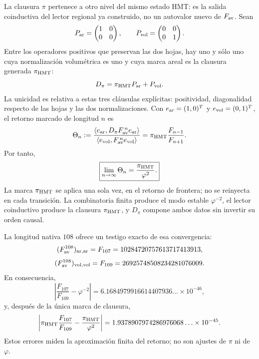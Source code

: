 La clausura \(\pi\) pertenece a otro nivel del mismo estado HMT: es la salida
coinductiva del lector regional ya construido, no un autovalor nuevo de
\(F_{\rm av}\). Sean
\[
 P_{\rm ar}=
 \begin{pmatrix}1&0\\0&0\end{pmatrix},
 \qquad
 P_{\rm vol}=
 \begin{pmatrix}0&0\\0&1\end{pmatrix}.
\]
Entre los operadores positivos que preservan las dos hojas, hay uno y sólo
uno cuya normalización volumétrica es uno y cuya marca areal es la clausura
generada \(\pi_{\rm HMT}\):
\[
 D_\pi=\pi_{\rm HMT}P_{\rm ar}+P_{\rm vol}.
\]
La unicidad es relativa a estas tres cláusulas explícitas: positividad,
diagonalidad respecto de las hojas y las dos normalizaciones. Con
\(e_{\rm ar}=(1,0)^T\) y \(e_{\rm vol}=(0,1)^T\), el retorno marcado de
longitud \(n\) es
\[
 \Theta_n
 :=
 \frac{\langle e_{\rm ar},
 D_\pi F_{\rm av}^{\,n}e_{\rm ar}\rangle}
 {\langle e_{\rm vol},
 F_{\rm av}^{\,n}e_{\rm vol}\rangle}
 =
 \pi_{\rm HMT}\frac{F_{n-1}}{F_{n+1}}.
\]
Por tanto,
\[
 \boxed{\displaystyle
 \lim_{n\to\infty}\Theta_n
 =\frac{\pi_{\rm HMT}}{\varphi^2}.}
\]
La marca \(\pi_{\rm HMT}\) se aplica una sola vez, en el retorno de frontera;
no se reinyecta en cada transición. La combinatoria finita produce el modo
estable \(\varphi^{-2}\), el lector coinductivo produce la clausura
\(\pi_{\rm HMT}\), y \(D_\pi\) compone ambos datos sin invertir su orden
causal.

La longitud nativa \(108\) ofrece un testigo exacto de esa convergencia:
\[
 (F_{\rm av}^{108})_{\rm ar,ar}
 =F_{107}=10284720757613717413913,
\]
\[
 (F_{\rm av}^{108})_{\rm vol,vol}
 =F_{109}=26925748508234281076009.
\]
En consecuencia,
\[
 \left|
 \frac{F_{107}}{F_{109}}-\varphi^{-2}
 \right|
 =
 6.1684979916614407936\ldots\times10^{-46},
\]
y, después de la única marca de clausura,
\[
 \left|
 \pi_{\rm HMT}\frac{F_{107}}{F_{109}}
 -\frac{\pi_{\rm HMT}}{\varphi^2}
 \right|
 =
 1.9378907974286976068\ldots\times10^{-45}.
\]
Estos errores miden la aproximación finita del retorno; no son ajustes de
\(\pi\) ni de \(\varphi\).

